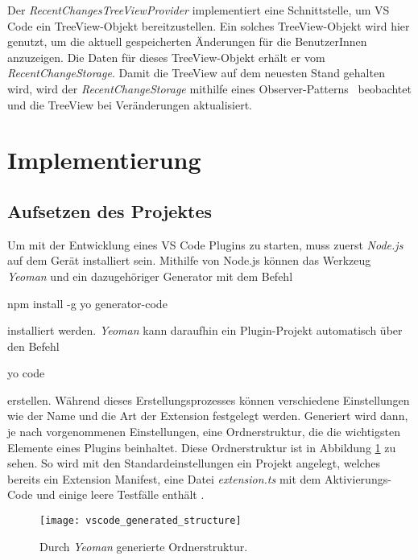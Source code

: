Der \emph{RecentChangesTreeViewProvider} implementiert eine Schnittstelle,
um VS Code ein TreeView-Objekt bereitzustellen. Ein solches TreeView-Objekt
wird hier genutzt, um die aktuell gespeicherten Änderungen
für die BenutzerInnen anzuzeigen.
Die Daten für dieses TreeView-Objekt
erhält er vom \emph{RecentChangeStorage}. Damit die TreeView auf dem neuesten Stand
gehalten wird, wird der \emph{RecentChangeStorage} mithilfe eines Observer-Patterns~\cite{2005Dp:e}
beobachtet und die TreeView bei Veränderungen aktualisiert.


\section{Implementierung}
\label{sec:EntwicklungVsCode_Implementierung}

\subsection{Aufsetzen des Projektes}

Um mit der Entwicklung eines VS Code Plugins zu starten, muss zuerst \emph{Node.js} \cite{NodeJSWebsite}
auf dem Gerät installiert sein. Mithilfe von Node.js können das Werkzeug
\emph{Yeoman} \cite{YeomanWebsite} und ein dazugehöriger Generator mit dem Befehl
\begin{GenericCode}[numbers=none]
    npm install -g yo generator-code
\end{GenericCode}
installiert werden.
\emph{Yeoman} kann daraufhin ein Plugin-Projekt automatisch über den Befehl
\begin{GenericCode}[numbers=none]
    yo code
\end{GenericCode}
erstellen. Während dieses Erstellungsprozesses können verschiedene Einstellungen
wie der Name und die Art der Extension festgelegt werden. Generiert wird dann,
je nach vorgenommenen Einstellungen, eine Ordnerstruktur, die die wichtigsten
Elemente eines Plugins beinhaltet. Diese Ordnerstruktur ist in Abbildung 
\ref{fig:vscode_generated_structure} zu sehen.
So wird mit den Standardeinstellungen
ein Projekt angelegt, welches bereits ein Extension Manifest, eine Datei 
\emph{extension.ts} mit dem Aktivierungs-Code und einige leere Testfälle enthält
\cite{VSCodeExtensionAPIYourFirstExtension}.

\begin{figure}
    \centering
    \texttt{[image: vscode\_generated\_structure]}
    \caption{Durch \emph{Yeoman} generierte Ordnerstruktur.}
    \label{fig:vscode_generated_structure}
\end{figure}   

